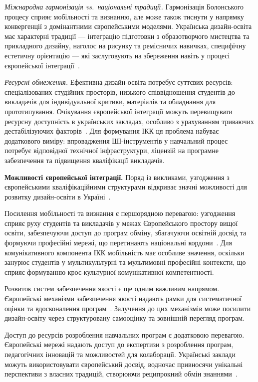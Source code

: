 \emph{Міжнародна гармонізація vs.\ національні традиції.} Гармонізація Болонського процесу сприяє мобільності та визнанню, але може також тиснути у напрямку конвергенції з домінантними європейськими моделями. Українська дизайн-освіта має характерні традиції --- інтеграцію підготовки з образотворчого мистецтва та прикладного дизайну, наголос на рисунку та ремісничих навичках, специфічну естетичну орієнтацію --- які заслуговують на збереження навіть у процесі європейської інтеграції~\cite{Fursa2014}.

\emph{Ресурсні обмеження.} Ефективна дизайн-освіта потребує суттєвих ресурсів: спеціалізованих студійних просторів, низького співвідношення студентів до викладачів для індивідуальної критики, матеріалів та обладнання для прототипування. Очікування європейської інтеграції можуть перевищувати ресурсну доступність в українських закладах, особливо з урахуванням триваючих дестабілізуючих факторів~\cite{Musiienko2025DesignEducation}. Для формування ІКК ця проблема набуває додаткового виміру: впровадження ШІ-інструментів у навчальний процес потребує відповідної технічної інфраструктури, ліцензій на програмне забезпечення та підвищення кваліфікації викладачів.

\textbf{Можливості європейської інтеграції.} Поряд із викликами, узгодження з європейськими кваліфікаційними структурами відкриває значні можливості для розвитку дизайн-освіти в Україні~\cite{Musiienko2025DesignEducation}.

Посилення мобільності та визнання є першорядною перевагою: узгодження сприяє руху студентів та викладачів у межах Європейського простору вищої освіти, забезпечуючи доступ до програм обміну, збагачуючи освітній досвід та формуючи професійні мережі, що перетинають національні кордони~\cite{Bohlinger2012279}. Для комунікативного компонента ІКК мобільність має особливе значення, оскільки занурює студентів у мультикультурні та мультимовні професійні контексти, що сприяє формуванню крос-культурної комунікативної компетентності.

Розвиток систем забезпечення якості є ще одним важливим напрямом. Європейські механізми забезпечення якості надають рамки для систематичної оцінки та вдосконалення програм~\cite{Srivastava2024305}. Залучення до цих механізмів може посилити дизайн-освіту через структуровану самооцінку та зовнішній перегляд програм.

Доступ до ресурсів розроблення навчальних програм є додатковою перевагою. Європейські мережі надають доступ до експертизи з розроблення програм, педагогічних інновацій та можливостей для колаборації. Українські заклади можуть використовувати європейський досвід, водночас привносячи унікальні перспективи з власних традицій, створюючи реципрокний обмін знаннями~\cite{Gonzalez2003}.

